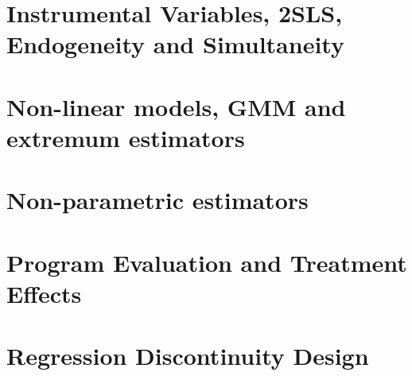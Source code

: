 \documentclass[12pt]{report} %
\begin{document}


\chapter{Instrumental Variables, 2SLS, Endogeneity and Simultaneity}



\chapter{Non-linear models, GMM and extremum estimators}



\chapter{Non-parametric estimators}



\chapter{Program Evaluation and Treatment Effects}



\chapter{Regression Discontinuity Design}


\end{document}
